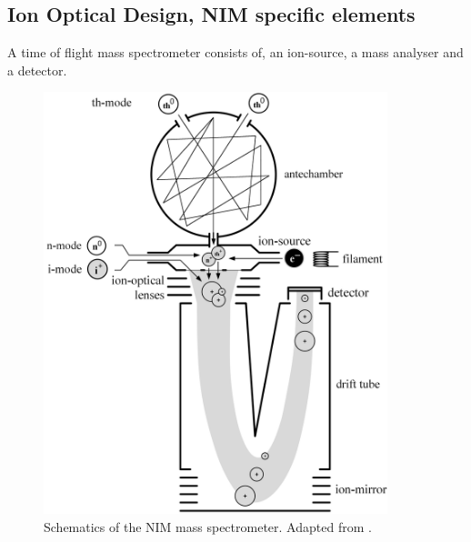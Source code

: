 	
	\subsection{Ion Optical Design, NIM specific elements} %
	
	A time of flight mass spectrometer consists of, an ion-source, a mass analyser and a detector.\\
	
	\begin{figure}[htb] %
		\centering
		\includegraphics[width= 10cm]{Bilder/NIM_Sketch.png} %
		\caption{Schematics of the NIM mass spectrometer. Adapted from \cite{Diss_Meyer}.}
		\label{fig:NIMSketch}
	\end{figure}

